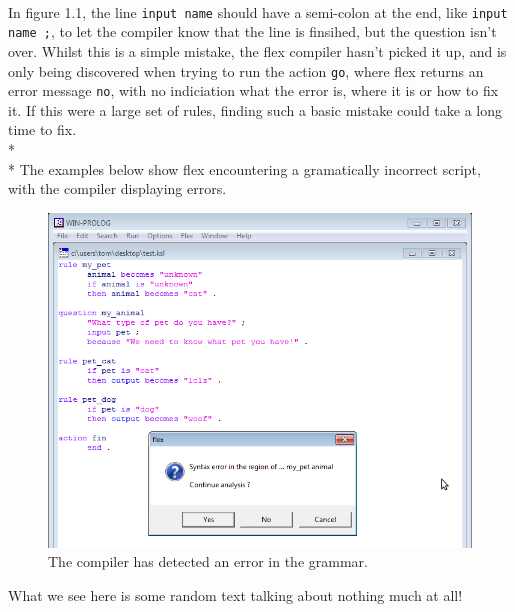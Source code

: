 \documentclass[12pt]{report}
\begin{document}
\\
In figure 1.1, the line \texttt{input name} should have a semi-colon at the end, like \texttt{input name ;}, to let the compiler know that the line is finsihed, but the question isn't over.  Whilst this is a simple mistake, the flex compiler hasn't picked it up, and is only being discovered when trying to run the action \texttt{go}, where flex returns an error message \texttt{no}, with no indiciation what the error is, where it is or how to fix it.  If this were a large set of rules, finding such a basic mistake could take a long time to fix.
\\*
\\*
The examples below show flex encountering a gramatically incorrect script, with the compiler displaying errors.
\begin{figure}[h]
	\centering
		\includegraphics[scale=0.65]{flex_error1}
		\caption{The compiler has detected an error in the grammar.}
\end{figure}
What we see here is some random text talking about nothing much at all!
\end{document}
